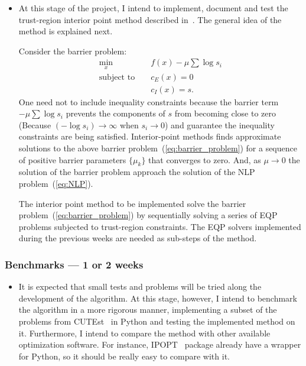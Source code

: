 \documentclass[11pt]{article}
\begin{document}
\begin{itemize}
\item
  At this stage of the project, I intend to implement, document and test the trust-region
  interior point method described in~\cite{byrd1999interior}. The general idea of
  the method is explained next.

  Consider the barrier problem:
  \begin{eqnarray}
    \label{eq:barrier_problem}
       \min_x && f(x) - \mu \sum \log s_i\\\nonumber
       \text{subject to } && c_E(x) = 0 \\\nonumber
       && c_I(x)  = s.
  \end{eqnarray}
  One need not to include inequality constraints because the barrier term $ - \mu \sum \log s_i$
  prevents the components of $s$ from becoming close to zero (Because $(-\log s_i) \rightarrow \infty$
  when $s_i \rightarrow 0$) and guarantee the inequality constraints are being satisfied.
  Interior-point methods finds approximate solutions to the above barrier problem~(\ref{eq:barrier_problem})
  for a sequence of positive barrier parameters $\{\mu_k\}$ that converges to zero.
  And, as $\mu \rightarrow 0$ the solution of the barrier problem approach the
  solution of the NLP problem~(\ref{eq:NLP}).
  
  The interior point method to be implemented solve the barrier problem~(\ref{eq:barrier_problem})
  by sequentially solving a series of EQP problems subjected to  trust-region constraints.
  The EQP solvers implemented during the previous weeks are needed as sub-steps of the method.
\end{itemize}

\subsubsection*{Benchmarks --- 1 or 2 weeks}

\begin{itemize}
\item

  It is expected that small tests and problems will be tried along the development of the algorithm.
  At this stage, however, I intend to benchmark the algorithm in a more rigorous manner,
  implementing a subset of the problems from  CUTEst~\cite{gould2015cutest}
  in Python and testing the implemented method on it.  Furthermore, I intend to compare the method
  with other available optimization software. For instance, IPOPT~\cite{wachter2006implementation}
  package already have a wrapper for Python, so it should be really easy to compare with it.
\end{itemize}
\end{document}
